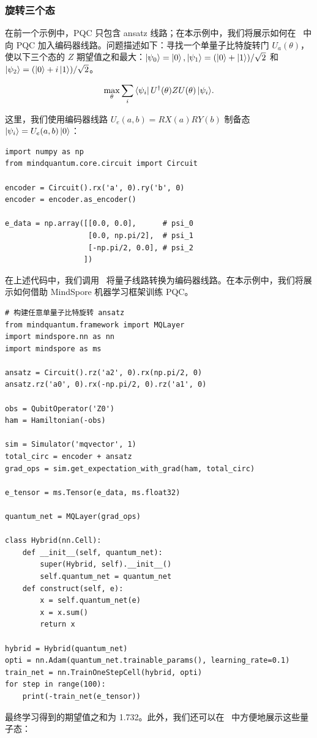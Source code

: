 \subsubsection{旋转三个态}
\label{sec:rotate_three_states}

在前一个示例中，PQC 只包含 ansatz 线路；在本示例中，我们将展示如何在 \MindQuantum\ 中向 PQC 加入编码器线路。问题描述如下：寻找一个单量子比特旋转门 $U_a(\theta)$，使以下三个态的 $Z$ 期望值之和最大：$\ket{\psi_0}=\ket{0},\ket{\psi_1}=(\ket{0}+\ket{1})/\sqrt{2}$ 和 $\ket{\psi_2}=(\ket{0}+i\ket{1})/\sqrt{2}$。

\begin{equation}
  \max_{\theta}\sum_i{\bra{\psi_i}U^\dagger(\theta)ZU(\theta)\ket{\psi_i}}.
\end{equation}

这里，我们使用编码器线路 $U_e(a, b) = RX(a)RY(b)$ 制备态 $\ket{\psi_i}=U_e(a, b)\ket{0}$：
\begin{lstlisting}
import numpy as np
from mindquantum.core.circuit import Circuit

encoder = Circuit().rx('a', 0).ry('b', 0)
encoder = encoder.as_encoder()

e_data = np.array([[0.0, 0.0],      # psi_0
                   [0.0, np.pi/2],  # psi_1
                   [-np.pi/2, 0.0], # psi_2
                  ])
\end{lstlisting}
在上述代码中，我们调用 \asencoder\ 将量子线路转换为编码器线路。在本示例中，我们将展示如何借助 MindSpore 机器学习框架训练 PQC。

\begin{lstlisting}
# 构建任意单量子比特旋转 ansatz
from mindquantum.framework import MQLayer
import mindspore.nn as nn
import mindspore as ms

ansatz = Circuit().rz('a2', 0).rx(np.pi/2, 0)
ansatz.rz('a0', 0).rx(-np.pi/2, 0).rz('a1', 0)

obs = QubitOperator('Z0')
ham = Hamiltonian(-obs)

sim = Simulator('mqvector', 1)
total_circ = encoder + ansatz
grad_ops = sim.get_expectation_with_grad(ham, total_circ)

e_tensor = ms.Tensor(e_data, ms.float32)

quantum_net = MQLayer(grad_ops)

class Hybrid(nn.Cell):
    def __init__(self, quantum_net):
        super(Hybrid, self).__init__()
        self.quantum_net = quantum_net
    def construct(self, e):
        x = self.quantum_net(e)
        x = x.sum()
        return x

hybrid = Hybrid(quantum_net)
opti = nn.Adam(quantum_net.trainable_params(), learning_rate=0.1)
train_net = nn.TrainOneStepCell(hybrid, opti)
for step in range(100):
    print(-train_net(e_tensor))
\end{lstlisting}
最终学习得到的期望值之和为 1.732。此外，我们还可以在 \MindQuantum\ 中方便地展示这些量子态：

